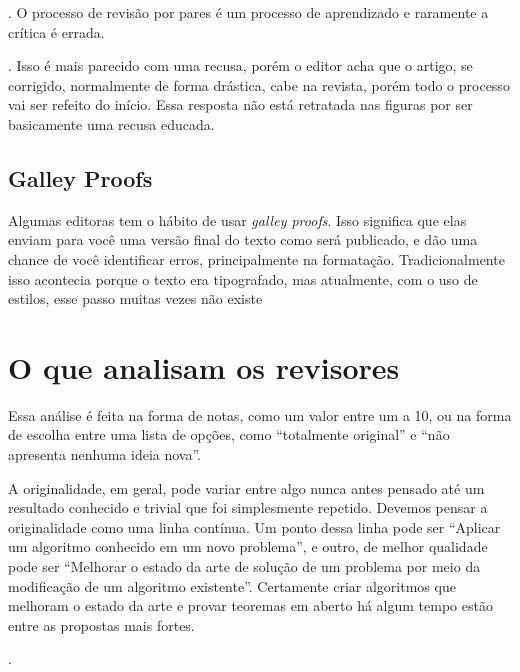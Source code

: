 \documentclass[openany]{book}
\begin{document}
. O processo de revisão por pares é um processo de aprendizado e raramente a crítica é errada.


. Isso é mais parecido com uma recusa, porém o editor acha que o artigo, se corrigido, normalmente de forma drástica, cabe na revista, porém todo o processo vai ser refeito do início. Essa resposta não está retratada nas figuras por ser basicamente uma recusa educada.

\subsection{Galley Proofs}

Algumas editoras tem o hábito de usar \textit{galley proofs}. Isso significa que elas enviam para você uma versão final do texto como será publicado, e dão uma chance de você identificar erros, principalmente na formatação. Tradicionalmente isso acontecia porque o texto era tipografado, mas atualmente, com o uso de estilos, esse passo muitas vezes não existe


\section{O que analisam os revisores}

 Essa análise é feita na forma de notas, como um valor entre um a 10, ou na forma de escolha entre uma lista de opções, como ``totalmente original'' e ``não apresenta nenhuma ideia nova''.


 A originalidade, em geral, pode variar entre algo nunca antes pensado até um resultado conhecido e trivial que foi simplesmente repetido. Devemos pensar a originalidade como uma linha contínua. Um ponto dessa linha pode ser ``Aplicar um algoritmo conhecido em um novo problema'', e outro, de melhor qualidade pode ser ``Melhorar o estado da arte de solução de um problema por meio da modificação de um algoritmo existente''. Certamente criar algoritmos que melhoram o estado da arte e provar teoremas em aberto há algum tempo estão entre as propostas mais fortes.

.
\end{document}
